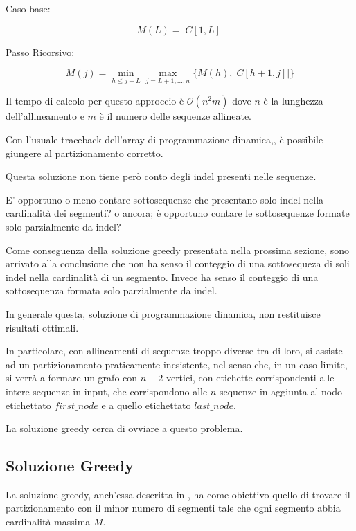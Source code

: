 Caso base:

\begin{equation*}
    M(L)= |C[1,L]| 
\end{equation*}

Passo Ricorsivo:

\begin{equation*}
    M(j)= \min_{h \leq j-L} \max_{j=L+1,...,n} \{M(h),|C[h+1,j]|\}
\end{equation*}

Il tempo di calcolo per questo approccio è $\mathcal{O}(n^2m)$ dove $n$ è la lunghezza dell'allineamento e $m$ è il numero delle sequenze allineate.

Con l'usuale traceback dell'array di programmazione dinamica,, è possibile giungere al partizionamento corretto.

Questa soluzione non tiene però conto degli indel presenti nelle sequenze. 

E' opportuno o meno contare sottosequenze che presentano solo indel nella cardinalità dei segmenti? o ancora; è opportuno contare le sottosequenze formate solo parzialmente da indel?

Come conseguenza della soluzione greedy presentata nella prossima sezione, sono arrivato alla conclusione che non ha senso il conteggio di una sottosequeza di soli indel nella cardinalità di un segmento. Invece ha senso il conteggio di una sottosequenza formata solo parzialmente da indel.

In generale questa, soluzione di programmazione dinamica, non restituisce risultati ottimali.

In particolare, con allineamenti di sequenze troppo diverse tra di loro, si assiste ad un partizionamento praticamente inesistente, nel senso che, in un caso limite, si verrà a formare un grafo con $n+2$ vertici, con etichette corrispondenti alle intere sequenze in input, che corrispondono alle $n$ sequenze in aggiunta al nodo etichettato $first\_node$ e a quello etichettato $last\_node$.

La soluzione greedy cerca di ovviare a questo problema.

\newpage

\subsection{Soluzione Greedy}

La soluzione greedy, anch'essa descritta in \cite{ukkonen}, ha come obiettivo quello di trovare il partizionamento con il minor numero di segmenti tale che ogni segmento abbia cardinalità massima $M$.

